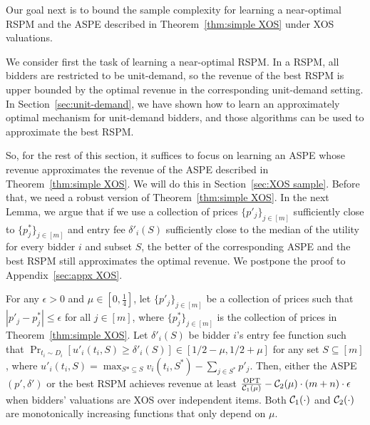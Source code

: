 {%
Our goal next is to bound the sample complexity for learning a near-optimal RSPM and the ASPE described in Theorem~\ref{thm:simple XOS} under XOS valuations.} %

We consider first the task of learning a near-optimal RSPM. In a RSPM, all bidders are restricted to be unit-demand, so the revenue of the best RSPM is upper bounded by the optimal revenue in the corresponding unit-demand setting. In Section~\ref{sec:unit-demand}, we have shown how to learn an approximately optimal mechanism for unit-demand bidders, and those algorithms can be used to approximate the best RSPM. 

So, for the rest of this section, it suffices to focus on learning an ASPE whose revenue approximates the revenue of the ASPE described in Theorem~\ref{thm:simple XOS}.  We will do this in Section~\ref{sec:XOS sample}. Before that,
we need a robust version of Theorem~\ref{thm:simple XOS}. In the next Lemma, we argue that if we use a collection of prices $\{p'_j\}_{j\in[m]}$ sufficiently close to $\{p^*_j\}_{j\in[m]}$ and entry fee $\delta'_i(S)$ sufficiently close to the median of the utility for every bidder $i$ and subset $S$, the better of the corresponding ASPE and the best RSPM still approximates the optimal revenue. We postpone the proof to Appendix~\ref{sec:appx XOS}.

\begin{lemma}\label{lem:approx ASPE}
	For any $\epsilon>0$ and $\mu\in[0,\frac{1}{4}]$, let $\{p'_j\}_{j\in[m]}$ be a collection of prices such that $|p'_j-p^*_j|\leq \epsilon$ for all $j\in[m]$, where $\{p^*_j\}_{j\in[m]}$ is the collection of prices in Theorem~\ref{thm:simple XOS}. Let $\delta'_i(S)$ be bidder $i$'s entry fee function such that $\Pr_{t_i\sim D_i}\left [u'_i(t_i,S)\geq \delta'_i(S)\right]\in [1/2-\mu,1/2+\mu]$ for any set $S\subseteq [m]$, where $u'_i(t_i,S) = \max_{S*\subseteq S} v_i(t_i,S^*)-\sum_{j\in S^*} p'_j$. Then, either the ASPE$(p',\delta')$ or the best RSPM achieves revenue at least $\frac{\text{OPT}}{{\mathcal{C}}_1(\mu)}-{\mathcal{C}}_2(\mu)\cdot (m+n)\cdot \epsilon$ when bidders' valuations are XOS over independent items. Both ${\mathcal{C}}_1(\cdot)$ and ${\mathcal{C}}_2(\cdot)$ are  monotonically increasing functions that only depend on $\mu$. 
\end{lemma}

